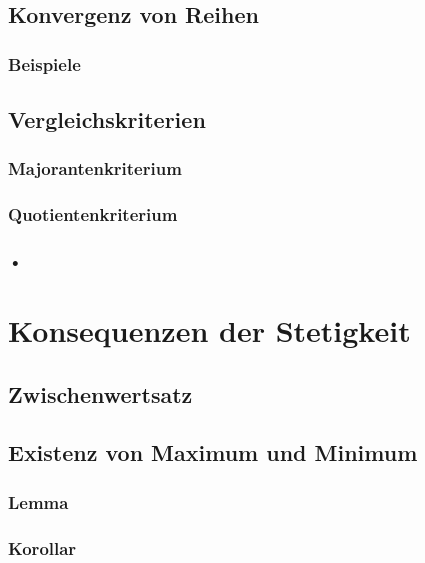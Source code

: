 \documentclass[10pt,a4paper^, twocolumn]{article}
\begin{document}
\subsection{Konvergenz von Reihen}
\subsubsection{Beispiele}
\subsection{Vergleichskriterien}
\subsubsection{Majorantenkriterium}
\subsubsection{Quotientenkriterium}
\subsubsection{•}

\section{Konsequenzen der Stetigkeit}
\subsection{Zwischenwertsatz} 
\subsection{Existenz von Maximum und Minimum}
\subsubsection{Lemma}
\subsubsection{Korollar}
\end{document}
